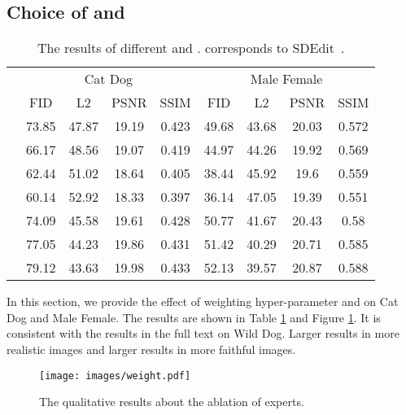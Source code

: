 \documentclass{article}
\begin{document}
\subsection{Choice of  and }
\label{sec:expert function}
\begin{table}[]
\caption{The results of different  and .  corresponds to SDEdit~\cite{meng2021sdedit}.}
\vspace{.2cm}
\label{tb:lambda analysis appendix}
\centering
\renewcommand\arraystretch{1.2}
\begin{tabular}{ccccccccc}
\toprule
\multirow{2}{*}{} & \multicolumn{4}{c}{Cat  Dog}     & \multicolumn{4}{c}{Male  Female} \\
 \cmidrule(r){2-5}
 \cmidrule(r){6-9}
 & FID       & L2     & PSNR   & SSIM  & FID     & L2      & PSNR  & SSIM  \\
\midrule
              & 73.85 & 47.87   & 19.19 & 0.423  & 49.68  & 43.68  & 20.03 & 0.572 \\
\hdashline
                     & 66.17 & 48.56   & 19.07 & 0.419 & 44.97  & 44.26  & 19.92 & 0.569 \\
                    & 62.44 & 51.02   & 18.64 & 0.405 & 38.44  & 45.92  & 19.6  & 0.559 \\
                    & 60.14 & 52.92   & 18.33 & 0.397 & 36.14  & 47.05  & 19.39 & 0.551 \\
\hdashline
                      & 74.09 & 45.58   & 19.61 & 0.428 & 50.77  & 41.67  & 20.43 & 0.58  \\
                      & 77.05 & 44.23   & 19.86 & 0.431 & 51.42  & 40.29  & 20.71 & 0.585 \\
                     & 79.12 & 43.63   & 19.98 & 0.433 & 52.13  & 39.57  & 20.87 & 0.588\\
\bottomrule
\end{tabular}
\end{table}


In this section, we provide the effect of weighting hyper-parameter  and  on Cat  Dog and Male  Female. The results are shown in Table \ref{tb:lambda analysis appendix} and Figure \ref{fig: weight}. It is consistent with the results in the full text on Wild  Dog.
Larger  results in more realistic images and larger  results in more faithful images. 

\begin{figure}
  \centering
  \texttt{[image: images/weight.pdf]}
  \caption{The qualitative results about the ablation of experts.}
  \vspace{-0.5cm}
  \label{fig: weight}
\end{figure}
\end{document}
